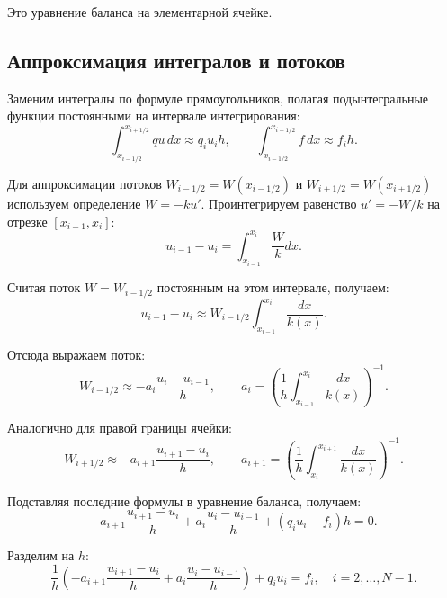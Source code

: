 \documentclass[14pt,a4paper]{extarticle}  %
\numberwithin{equation}{section}
\begin{document}
Это уравнение баланса на элементарной ячейке.

\subsection{Аппроксимация интегралов и потоков}

Заменим интегралы по формуле прямоугольников, полагая подынтегральные функции 
постоянными на интервале интегрирования:
\begin{equation}
    \int_{x_{i-1/2}}^{x_{i+1/2}} q u \, dx \approx q_i u_i h, \qquad
    \int_{x_{i-1/2}}^{x_{i+1/2}} f \, dx \approx f_i h.
\end{equation}

Для аппроксимации потоков \(W_{i-1/2} = W(x_{i-1/2})\) и \(W_{i+1/2} = W(x_{i+1/2})\) 
используем определение \(W = -k u'\). Проинтегрируем равенство \(u' = -W/k\) 
на отрезке \([x_{i-1}, x_i]\):
\begin{equation}
    u_{i-1} - u_i = \int_{x_{i-1}}^{x_i} \frac{W}{k} dx.
\end{equation}

Считая поток \(W = W_{i-1/2}\) постоянным на этом интервале, получаем:
\begin{equation}
    u_{i-1} - u_i \approx W_{i-1/2} \int_{x_{i-1}}^{x_i} \frac{dx}{k(x)}.
\end{equation}

Отсюда выражаем поток:
\begin{equation}
    W_{i-1/2} \approx -a_i \frac{u_i - u_{i-1}}{h}, \qquad
    a_i = \left( \frac{1}{h} \int_{x_{i-1}}^{x_i} \frac{dx}{k(x)} \right)^{-1}.
\end{equation}

Аналогично для правой границы ячейки:
\begin{equation}
    W_{i+1/2} \approx -a_{i+1} \frac{u_{i+1} - u_i}{h}, \qquad
    a_{i+1} = \left( \frac{1}{h} \int_{x_i}^{x_{i+1}} \frac{dx}{k(x)} \right)^{-1}.
\end{equation}

Подставляя последние формулы в уравнение баланса, получаем:
\begin{equation}
    -a_{i+1} \frac{u_{i+1} - u_i}{h} + a_i \frac{u_i - u_{i-1}}{h} + (q_i u_i - f_i) h = 0.
\end{equation}

Разделим на \(h\):
\begin{equation}
    \frac{1}{h}\left( -a_{i+1} \frac{u_{i+1} - u_i}{h} + a_i \frac{u_i - u_{i-1}}{h} \right) + q_i u_i = f_i, \quad i = 2, \dots, N-1.
\end{equation}
\end{document}
